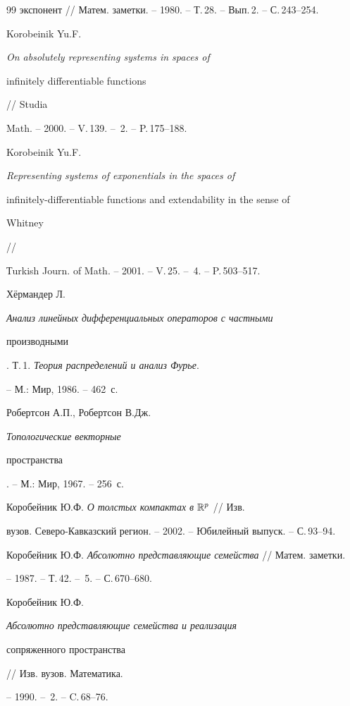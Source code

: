 \begin{thebibliography}{99}
{экспонент} // Матем. заметки. -- 1980. -- Т.\,28. -- Вып.\,2. -- С.\,243--254.




Korobeinik Yu.F. {\em On absolutely representing systems in spaces of


infinitely differentiable functions} // Studia


Math. -- 2000. -- V.\,139. -- \No\,2. -- P.\,175--188.




Korobeinik Yu.F. {\em Representing systems of exponentials in the spaces of


infinitely-differentiable functions and extendability in the sense of


Whitney} //


Тurkish Journ. of Math. -- 2001. -- V.\,25. -- \No\,4. -- P.\,503--517.




Х\"ермандер Л. {\em Анализ линейных дифференциальных операторов с частными


производными}. Т.\,1. {\em Теория распределений и анализ Фурье}.


-- М.: Мир, 1986. -- 462~с.




Робертсон А.П., Робертсон В.Дж. {\em Топологические векторные 


пространства}. -- М.: Мир, 1967. -- 256~с.




Коробейник Ю.Ф. {\em О толстых компактах в $\Bbb{R}^p$} // Изв.


вузов. Северо-Кавказский регион. -- 2002. -- Юбилейный выпуск. -- С.\,93--94.




Коробейник Ю.Ф. {\em Абсолютно представляющие семейства} // Матем. заметки.


-- 1987. -- Т.\,42. -- \No\,5. -- С.\,670--680.




Коробейник Ю.Ф. {\em Абсолютно представляющие семейства и реализация


сопряженного пространства} // Изв. вузов. Математика.


-- 1990. -- \No\,2. -- C.\,68--76.





\end{thebibliography}





\vskip 2cm












\label{end}








